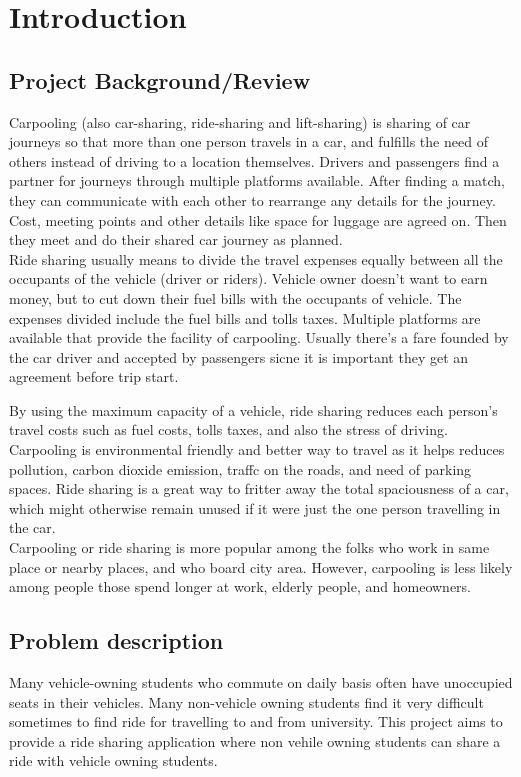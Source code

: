\chapter{Introduction} \label{chap:intro}

\section{Project Background/Review}

\justify
Carpooling (also car-sharing, ride-sharing and lift-sharing) is sharing of car journeys so that more than one person travels in a car, and fulfills the need of others instead of driving to a location themselves. Drivers and passengers ﬁnd a partner for journeys through multiple platforms available. After ﬁnding a match, they can communicate with each other to rearrange any details for the journey. Cost, meeting points and other details like space for luggage are agreed on. Then they meet and do their shared car journey as planned.\\

Ride sharing usually means to divide the travel expenses equally between all the occupants of the vehicle (driver or riders). Vehicle owner doesn’t want to earn money, but to cut down their fuel bills with the occupants of vehicle. The expenses divided include the fuel bills and tolls taxes. Multiple platforms are available that provide the facility of carpooling. Usually there’s a fare founded by the car driver and accepted by passengers sicne it is important they get an agreement before trip start.

By using the maximum capacity of a vehicle, ride sharing reduces each person’s travel costs such as fuel costs, tolls taxes, and also the stress of driving. Carpooling is environmental friendly and better way to travel as it helps reduces pollution, carbon dioxide emission,  traffc on the roads, and need of parking spaces. Ride sharing is a great way to fritter away the total spaciousness of a car, which might otherwise remain unused if it were just the one person travelling in the car.\\

Carpooling or ride sharing is more popular among the folks who work in same place or nearby places, and who board city area. However, carpooling is less likely among people those spend longer at work, elderly people, and homeowners.\\

\section{Problem description}
Many vehicle-owning students who commute on daily basis often have unoccupied seats in their vehicles. Many non-vehicle owning students find it very difficult sometimes to find ride for travelling to and from university. This project aims to provide a ride sharing application where non vehile owning students can share a ride with vehicle owning students.

